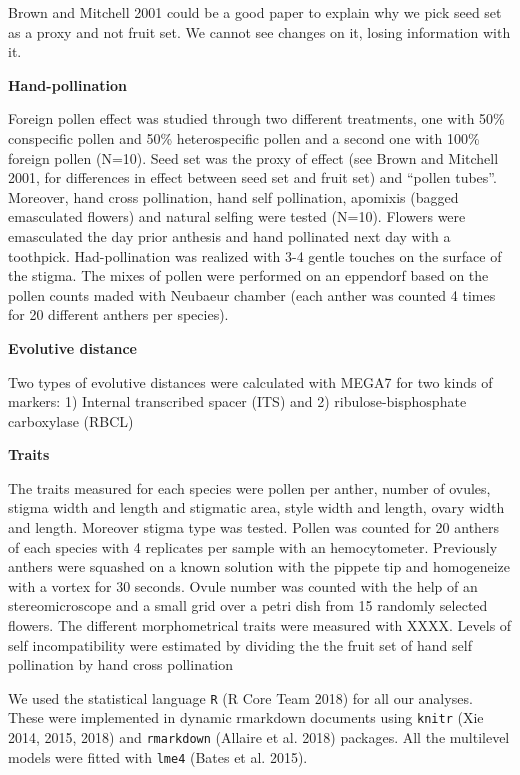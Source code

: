 \documentclass[11pt,a4paper]{article}
\begin{document}
Brown and Mitchell 2001 could be a good paper to explain why we pick
seed set as a proxy and not fruit set. We cannot see changes on it,
losing information with it.

\textbf{Hand-pollination}

Foreign pollen effect was studied through two different treatments, one
with 50\% conspecific pollen and 50\% heterospecific pollen and a second
one with 100\% foreign pollen (N=10). Seed set was the proxy of effect
(see Brown and Mitchell 2001, for differences in effect between seed set
and fruit set) and ``pollen tubes''. Moreover, hand cross pollination,
hand self pollination, apomixis (bagged emasculated flowers) and natural
selfing were tested (N=10). Flowers were emasculated the day prior
anthesis and hand pollinated next day with a toothpick. Had-pollination
was realized with 3-4 gentle touches on the surface of the stigma. The
mixes of pollen were performed on an eppendorf based on the pollen
counts maded with Neubaeur chamber (each anther was counted 4 times for
20 different anthers per species).

\textbf{Evolutive distance}

Two types of evolutive distances were calculated with MEGA7 for two
kinds of markers: 1) Internal transcribed spacer (ITS) and 2)
ribulose-bisphosphate carboxylase (RBCL)

\textbf{Traits}

The traits measured for each species were pollen per anther, number of
ovules, stigma width and length and stigmatic area, style width and
length, ovary width and length. Moreover stigma type was tested. Pollen
was counted for 20 anthers of each species with 4 replicates per sample
with an hemocytometer. Previously anthers were squashed on a known
solution with the pippete tip and homogeneize with a vortex for 30
seconds. Ovule number was counted with the help of an stereomicroscope
and a small grid over a petri dish from 15 randomly selected flowers.
The different morphometrical traits were measured with XXXX. Levels of
self incompatibility were estimated by dividing the the fruit set of
hand self pollination by hand cross pollination

We used the statistical language \texttt{R} (R Core Team 2018) for all
our analyses. These were implemented in dynamic rmarkdown documents
using \texttt{knitr} (Xie 2014, 2015, 2018) and \texttt{rmarkdown}
(Allaire et al. 2018) packages. All the multilevel models were fitted
with \texttt{lme4} (Bates et al. 2015).
\end{document}

